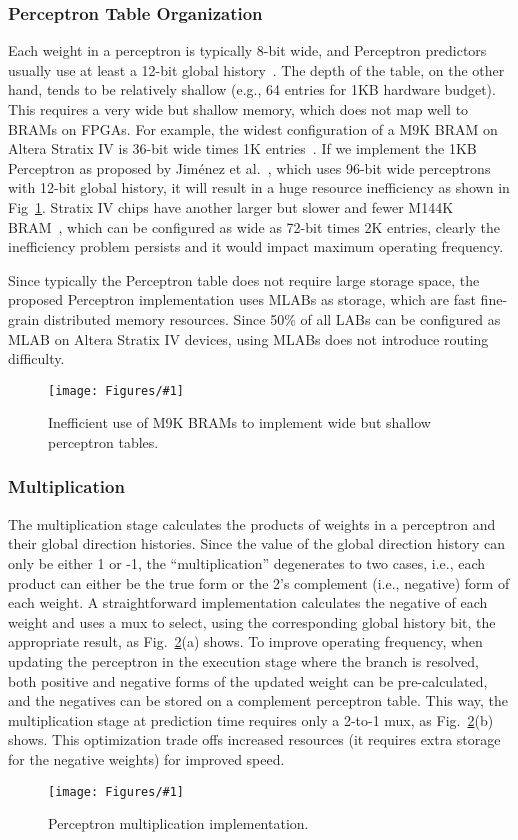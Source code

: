 \documentclass[conference]{IEEEtran}
\newcommand{\kfig}[4]{ %
        \begin{figure}[!t]
        \centering
        \texttt{[image: Figures/\#1]}
        \vspace{-1mm}
        \caption{#3}
        \label{#2}
        \end{figure}
}
\begin{document}
\subsubsection{Perceptron Table Organization}
\label{sec:fpga:perceptron:table}
Each weight in a perceptron is typically 8-bit wide, and Perceptron predictors usually use at least a 12-bit global history~\cite{perceptron}. The depth of the table, on the other hand, tends to be relatively shallow (e.g., 64 entries for 1KB hardware budget). This requires a very wide but shallow memory, which does not map well to BRAMs on FPGAs. For example, the widest configuration of a M9K BRAM on Altera Stratix IV is 36-bit wide times 1K entries~\cite{StratixIVM9K}. If we implement the 1KB Perceptron as proposed by Jim\'enez et al.~\cite{perceptron}, which uses 96-bit wide perceptrons with 12-bit global history, it will result in a huge resource inefficiency as shown in Fig~\ref{fig:perceptronTable}. Stratix IV chips have another larger but slower and fewer M144K BRAM~\cite{StratixIVM9K}, which can be configured as wide as 72-bit times 2K entries, clearly the inefficiency problem persists and it would impact maximum operating frequency.

Since typically the Perceptron table does not require large storage space, the proposed Perceptron implementation uses MLABs as storage, which are fast fine-grain distributed memory resources. Since 50\% of all LABs can be configured as MLAB on Altera Stratix IV devices, using MLABs does not introduce routing difficulty.
\kfig{perceptronTable.pdf}{fig:perceptronTable}{Inefficient use of M9K BRAMs to implement wide but shallow perceptron tables.}{angle = 0, trim = 1in 2in 3.4in 0.6in, clip, width=0.25\textwidth}


\subsubsection{Multiplication}
\label{sec:fpga:perceptron:mult}
The multiplication stage calculates the products of weights in a perceptron and their global direction histories. Since the value of the global direction history can only be either 1 or -1, the ``multiplication'' degenerates to two cases, i.e., each product can either be the true form or the 2's complement (i.e., negative) form of each weight. A straightforward implementation calculates the negative of each weight and uses a mux to select, using the corresponding global history bit, the appropriate result, as Fig.~\ref{fig:perceptronMult}(a) shows. To improve operating frequency, when updating the perceptron in the execution stage where the branch is resolved, both positive and negative forms of the updated weight can be pre-calculated, and the negatives can be stored on a complement perceptron table. This way, the multiplication stage at prediction time requires only a 2-to-1 mux, as Fig.~\ref{fig:perceptronMult}(b) shows. This optimization trade offs increased resources (it requires extra storage for the negative weights) for improved speed.
\kfig{perceptronMult.pdf}{fig:perceptronMult}{Perceptron multiplication implementation.}{angle = 0, trim = 0.3in 2.2in 3in 0.6in, clip, width=0.3\textwidth}
\end{document}
